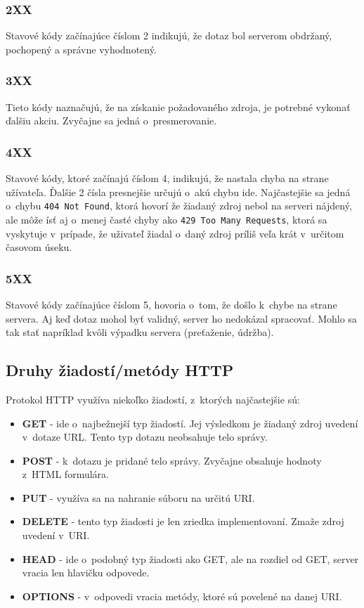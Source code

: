 \documentclass[slovak]{fitthesis}
\begin{document}
\label{2XX}
\subsubsection{2XX}
Stavové kódy začínajúce číslom 2 indikujú, že dotaz bol serverom obdržaný, pochopený a správne vyhodnotený.

\subsubsection{3XX}
Tieto kódy naznačujú, že na získanie požadovaného zdroja, je potrebné vykonať ďalšiu akciu. Zvyčajne sa jedná o~presmerovanie.

\label{4XX}
\subsubsection{4XX}
Stavové kódy, ktoré začínajú číslom 4, indikujú, že nastala chyba na strane užívateľa. Ďalšie 2 čísla presnejšie určujú o~akú chybu ide. Najčastejšie sa jedná o~chybu \texttt{404 Not Found}, ktorá hovorí že žiadaný zdroj nebol na serveri nájdený, ale môže ísť aj o~menej časté chyby ako \texttt{429 Too Many Requests}, ktorá sa vyskytuje v~prípade, že uživateľ žiadal o~daný zdroj príliš veľa krát v~určitom časovom úseku.

\label{5XX}
\subsubsection{5XX}
Stavové kódy začínajúce číslom 5, hovoria o~tom, že došlo k~chybe na strane servera. Aj keď dotaz mohol byť validný, server ho nedokázal spracovať. Mohlo sa tak stať napríklad kvôli výpadku servera (preťaženie, údržba).

\subsection{Druhy žiadostí/metódy HTTP}
Protokol HTTP využíva niekoľko žiadostí, z~ktorých najčastejšie sú:
\begin{itemize}
    \item \textbf{GET} - ide o~najbežnejší typ žiadostí. Jej výsledkom je žiadaný zdroj uvedení v~dotaze URL. Tento typ dotazu neobsahuje telo správy.
    \item \textbf{POST} - k~dotazu je pridané telo správy. Zvyčajne obsahuje hodnoty z~HTML formulára.
    \item \textbf{PUT} - využíva sa na nahranie súboru na určitú URI.
    \item \textbf{DELETE} - tento typ žiadosti je len zriedka implementovaní. Zmaže zdroj uvedení v~URI.
    \item \textbf{HEAD} - ide o~podobný typ žiadosti ako GET, ale na rozdiel od GET, server vracia len hlavičku odpovede.
    \item \textbf{OPTIONS} - v~odpovedi vracia metódy, ktoré sú povelené na danej URI.
\end{itemize}
\end{document}
